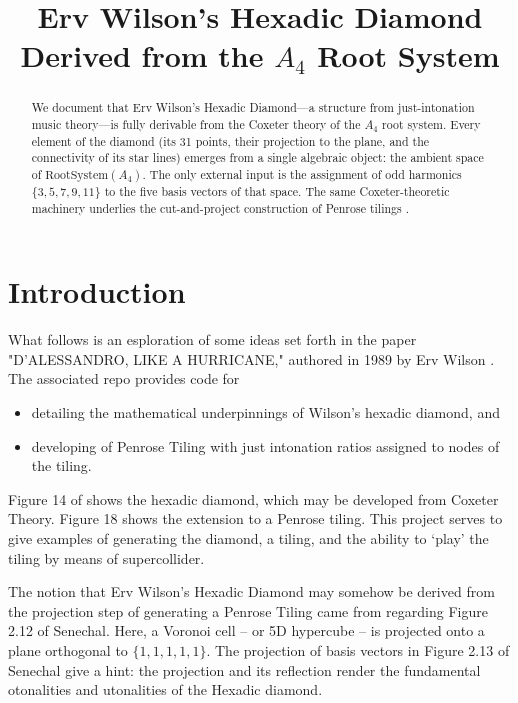 \documentclass[11pt]{article}
\title{Erv Wilson's Hexadic Diamond Derived from the $A_4$ Root System}
\author{}
\date{}
\begin{document}
\maketitle

\begin{abstract}
We document that Erv Wilson's Hexadic Diamond---a structure from just-intonation
music theory---is fully derivable from the Coxeter theory of the $A_4$ root
system. Every element of the diamond (its 31 points, their projection to the
plane, and the connectivity of its star lines) emerges from a single algebraic
object: the ambient space of $\mathrm{RootSystem}(A_4)$. The only external
input is the assignment of odd harmonics $\{3,5,7,9,11\}$ to the five basis
vectors of that space. The same Coxeter-theoretic machinery underlies the
cut-and-project construction of Penrose tilings \cite{senechal1995,boyleSteinhardt2022}.
\end{abstract}

\section{Introduction}

What follows is an esploration of some ideas set forth in the paper "D'ALESSANDRO, LIKE A HURRICANE," authored in 1989 by Erv Wilson \cite{wilson1989}. The associated repo provides code for 
\begin{itemize}
\item detailing the mathematical underpinnings of Wilson's hexadic diamond, and
\item developing of Penrose Tiling with just intonation ratios assigned to nodes of the tiling. 
\end{itemize}
Figure 14 of \cite{wilson1989} shows the hexadic diamond, which may be developed from Coxeter Theory.  Figure 18 shows the extension to a Penrose tiling. This project serves to give examples of generating the diamond, a tiling, and the ability to `play' the tiling by means of supercollider.

The notion that Erv Wilson's Hexadic Diamond may somehow be derived from the projection step of generating a Penrose Tiling came from regarding Figure 2.12 of Senechal. Here, a Voronoi cell -- or 5D hypercube -- is projected onto a plane orthogonal to $\{1,1,1,1,1\}$.    The projection of basis vectors in Figure 2.13 of Senechal give a hint: the projection and its reflection render the fundamental otonalities and utonalities of the Hexadic diamond.
\end{document}

